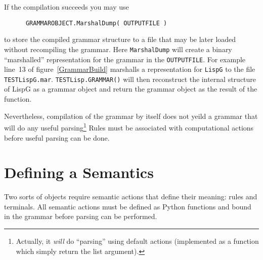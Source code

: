 If the compilation succeeds you may use
\begin{verbatim}
      GRAMMAROBJECT.MarshalDump( OUTPUTFILE )
\end{verbatim}
to store the compiled grammar structure to a file that
may be later loaded without recompiling the grammar.
Here {\tt MarshalDump} will create a binary ``marshalled''
representation for the grammar in the {\tt OUTPUTFILE}.
For example line~13 of figure~\ref{GrammarBuild} 
marshalls a representation for {\tt LispG} to the
file {\tt TESTLispG.mar}.
{\tt TESTLisp.GRAMMAR()} will 
then reconstruct the internal
structure of LispG as a grammar object and return the
grammar object as the result of the function.

Nevertheless, compilation of the grammar by itself does
not yeild a grammar that will do any useful 
parsing\footnote{Actually, it {\em will} do ``parsing'' using
default actions (implemented as a function which simply return
the list argument).}
Rules must be associated with computational actions before
useful parsing can be done.

\section{Defining a Semantics}

Two sorts of objects require semantic actions that
define their meaning: rules and terminals.
All semantic actions must be defined as Python functions
and bound in the grammar before parsing can be performed.

